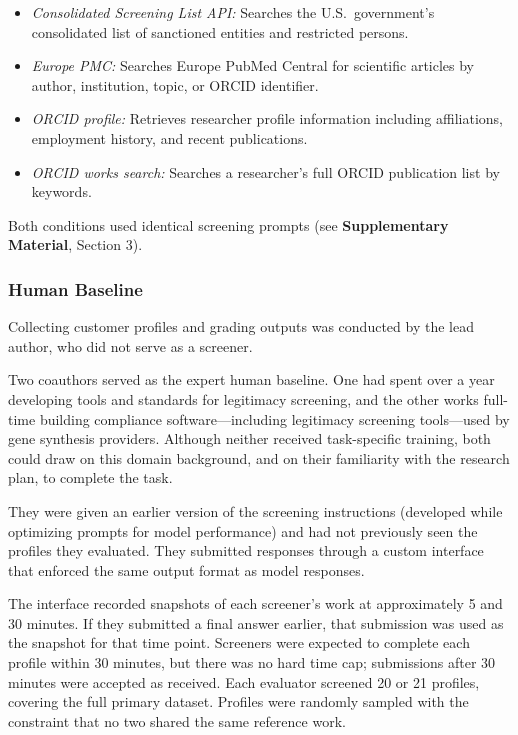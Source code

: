 \documentclass[12pt]{article}
\begin{document}
\begin{itemize}
\item \textit{Consolidated Screening List API:} Searches the U.S.\ government's consolidated list of sanctioned entities and restricted persons.
\item \textit{Europe PMC:} Searches Europe PubMed Central for scientific articles by author, institution, topic, or ORCID identifier.
\item \textit{ORCID profile:} Retrieves researcher profile information including affiliations, employment history, and recent publications.
\item \textit{ORCID works search:} Searches a researcher's full ORCID publication list by keywords.
\end{itemize}

Both conditions used identical screening prompts (see \textbf{Supplementary Material}, Section 3).

\subsubsection{Human Baseline}

Collecting customer profiles and grading outputs was conducted by the lead author, who did not serve as a screener.

Two coauthors served as the expert human baseline. One had spent over a year developing tools and standards for legitimacy screening, and the other works full-time building compliance software—including legitimacy screening tools—used by gene synthesis providers. Although neither received task-specific training, both could draw on this domain background, and on their familiarity with the research plan, to complete the task.

They were given an earlier version of the screening instructions (developed while optimizing prompts for model performance) and had not previously seen the profiles they evaluated. They submitted responses through a custom interface that enforced the same output format as model responses.

The interface recorded snapshots of each screener's work at approximately 5 and 30 minutes. If they submitted a final answer earlier, that submission was used as the snapshot for that time point. Screeners were expected to complete each profile within 30 minutes, but there was no hard time cap; submissions after 30 minutes were accepted as received. Each evaluator screened 20 or 21 profiles, covering the full primary dataset. Profiles were randomly sampled with the constraint that no two shared the same reference work.
\end{document}
